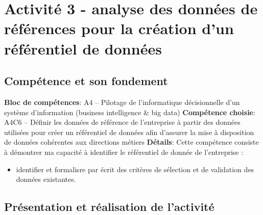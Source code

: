 \documentclass[a4paper, 11pt]{report}
\begin{document}
\section{Activité 3 - analyse des données de références pour la création d'un référentiel de données}
\subsection{Compétence et son fondement}
\textbf{Bloc de compétences}: A4 – Pilotage de l’informatique décisionnelle d’un système d’information (business intelligence & big data)
\newline
\textbf{Compétence choisie}: A4C6 – Définir les données de référence de l’entreprise à partir des données utilisées pour créer un référentiel de données afin d’assurer la mise à disposition de données cohérentes aux directions métiers
\newline
\textbf{Détails}: Cette compétence consiste à démontrer ma capacité à identifier le référentiel de donnée de l’entreprise :
\begin{itemize}
  \item identifier et formalisre par écrit des critères de sélection et de validation des données existantes.
\end{itemize}
\subsection{Présentation et réalisation de l'activité}
\end{document}
